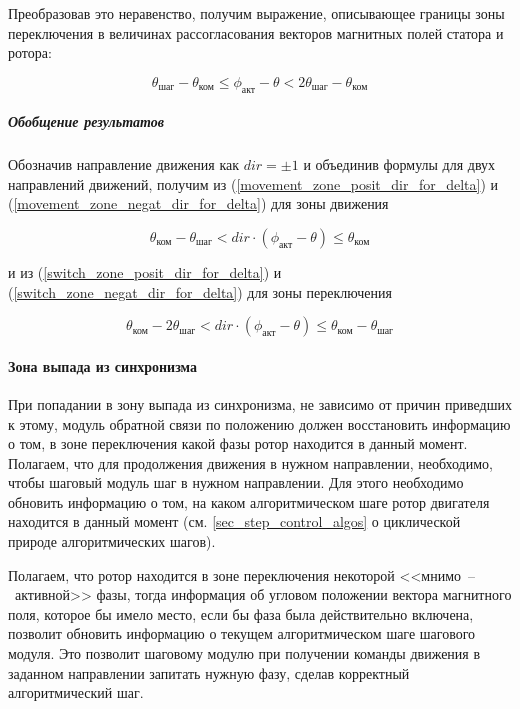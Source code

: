 Преобразовав это неравенство, получим выражение, описывающее границы зоны переключения
в величинах рассогласования векторов магнитных полей статора и ротора:

\begin{equation}
    \label{switch_zone_negat_dir_for_delta}
    \theta_\textit{шаг} - \theta_\textit{ком}
    \leq \phi_\textit{акт} - \theta
    < 2\theta_\textit{шаг} - \theta_\textit{ком}
\end{equation}


\subparagraph{Обобщение результатов}

Обозначив направление движения как $\textit{dir} = \pm 1$ и объединив формулы
для двух направлений движений, получим из (\ref{movement_zone_posit_dir_for_delta})
и (\ref{movement_zone_negat_dir_for_delta}) для зоны движения

\begin{equation}
    \label{movement_zone_for_delta}
    \theta_\textit{ком} - \theta_\textit{шаг}
    < dir \cdot (\phi_\textit{акт} - \theta)
    \leq \theta_\textit{ком}
\end{equation}

и из (\ref{switch_zone_posit_dir_for_delta})
и (\ref{switch_zone_negat_dir_for_delta}) для зоны переключения

\begin{equation}
    \label{switch_zone_for_delta}
    \theta_\textit{ком} - 2\theta_\textit{шаг}
    < dir \cdot (\phi_\textit{акт} - \theta)
    \leq \theta_\textit{ком} - \theta_\textit{шаг}
\end{equation}

\paragraph{Зона выпада из синхронизма}

При попадании в зону выпада из синхронизма, не зависимо от причин приведших к этому,
модуль обратной связи по положению должен восстановить информацию о том,
в зоне переключения какой фазы ротор находится в данный момент. Полагаем, что для
продолжения движения в нужном направлении, необходимо, чтобы шаговый модуль
шаг в нужном направлении. Для этого необходимо обновить информацию о том, на каком
алгоритмическом шаге ротор двигателя находится в данный момент
(см. \ref{sec_step_control_algos} о циклической природе алгоритмических шагов).

Полагаем, что ротор находится в зоне переключения некоторой <<мнимо~--~активной>> фазы,
тогда информация об угловом положении вектора магнитного поля, которое бы имело место,
если бы фаза была действительно включена, позволит обновить информацию о текущем
алгоритмическом шаге шагового модуля. Это позволит шаговому модулю при получении
команды движения в заданном направлении запитать нужную фазу, сделав корректный
алгоритмический шаг.

